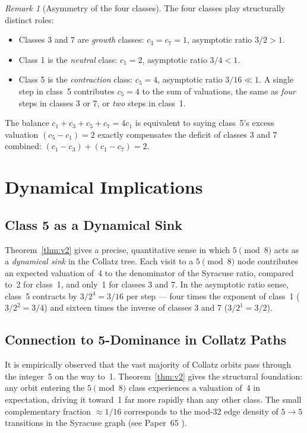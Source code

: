 \documentclass[12pt]{article}
\theoremstyle{definition}
\theoremstyle{remark}
\newtheorem{remark}[theorem]{Remark}
\begin{document}
\begin{remark}[Asymmetry of the four classes]
The four classes play structurally distinct roles:
\begin{itemize}
  \item Classes 3 and 7 are \emph{growth} classes: $c_3 = c_7 = 1$,
        asymptotic ratio $3/2 > 1$.
  \item Class 1 is the \emph{neutral} class: $c_1 = 2$, asymptotic ratio $3/4 < 1$.
  \item Class 5 is the \emph{contraction} class: $c_5 = 4$, asymptotic ratio
        $3/16 \ll 1$. A single step in class~5 contributes $c_5 = 4$ to the
        sum of valuations, the same as \emph{four} steps in classes 3 or 7,
        or \emph{two} steps in class~1.
\end{itemize}
The balance $c_1 + c_3 + c_5 + c_7 = 4 c_1$ is equivalent to saying
class~5's excess valuation $(c_5 - c_1) = 2$ exactly compensates the
deficit of classes 3 and 7 combined: $(c_1 - c_3) + (c_1 - c_7) = 2$.
\end{remark}

\section{Dynamical Implications}
\label{sec:dynamics}

\subsection{Class 5 as a Dynamical Sink}

Theorem~\ref{thm:v2} gives a precise, quantitative sense in which $5\pmod{8}$
acts as a \emph{dynamical sink} in the Collatz tree. Each visit to a $5\pmod{8}$
node contributes an expected valuation of~4 to the denominator of the Syracuse
ratio, compared to~2 for class~1, and only~1 for classes 3 and 7.
In the asymptotic ratio sense, class~5 contracts by $3/2^4 = 3/16$ per step
— four times the exponent of class~1 ($3/2^2 = 3/4$) and sixteen times the
inverse of classes 3 and 7 ($3/2^1 = 3/2$).

\subsection{Connection to 5-Dominance in Collatz Paths}

It is empirically observed that the vast majority of Collatz orbits pass through
the integer~5 on the way to~1. Theorem~\ref{thm:v2} gives the structural
foundation: any orbit entering the $5\pmod{8}$ class experiences a valuation
of~4 in expectation, driving it toward~1 far more rapidly than any other class.
The small complementary fraction $\approx 1/16$ corresponds to the mod-32
edge density of $5\to5$ transitions in the Syracuse graph (see Paper~65
\cite{paper65}).
\end{document}
